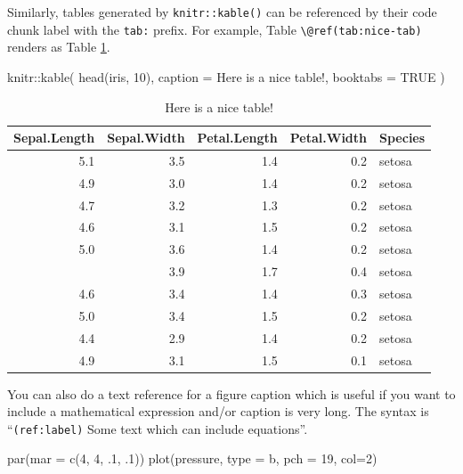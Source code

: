 \documentclass[
  british,
  oneside]{krantz}
\newenvironment{Shaded}{\begin{snugshade}}{\end{snugshade}}
\newcommand{\AttributeTok}[1]{\textcolor[rgb]{0.77,0.63,0.00}{#1}}
\newcommand{\ConstantTok}[1]{\textcolor[rgb]{0.00,0.00,0.00}{#1}}
\newcommand{\DecValTok}[1]{\textcolor[rgb]{0.00,0.00,0.81}{#1}}
\newcommand{\FunctionTok}[1]{\textcolor[rgb]{0.00,0.00,0.00}{#1}}
\newcommand{\NormalTok}[1]{#1}
\newcommand{\SpecialCharTok}[1]{\textcolor[rgb]{0.00,0.00,0.00}{#1}}
\newcommand{\StringTok}[1]{\textcolor[rgb]{0.31,0.60,0.02}{#1}}
\theoremstyle{definition}
\theoremstyle{definition}
\theoremstyle{definition}
\theoremstyle{definition}
\theoremstyle{remark}
\begin{document}
Similarly, tables generated by \texttt{knitr::kable()} can be referenced by their code chunk label with the \texttt{tab:} prefix. For example, Table \texttt{\textbackslash{}@ref(tab:nice-tab)} renders as Table \ref{tab:nice-tab}.

\begin{Shaded}
\begin{Highlighting}[]
\NormalTok{knitr}\SpecialCharTok{::}\FunctionTok{kable}\NormalTok{(}
  \FunctionTok{head}\NormalTok{(iris, }\DecValTok{10}\NormalTok{), }\AttributeTok{caption =} \StringTok{\textquotesingle{}Here is a nice table!\textquotesingle{}}\NormalTok{,}
  \AttributeTok{booktabs =} \ConstantTok{TRUE}
\NormalTok{)}
\end{Highlighting}
\end{Shaded}

\begin{table}

\caption{\label{tab:nice-tab}Here is a nice table!}
\centering
\begin{tabular}[t]{rrrrl}
\toprule
Sepal.Length & Sepal.Width & Petal.Length & Petal.Width & Species\\
\midrule
5.1 & 3.5 & 1.4 & 0.2 & setosa\\
4.9 & 3.0 & 1.4 & 0.2 & setosa\\
4.7 & 3.2 & 1.3 & 0.2 & setosa\\
4.6 & 3.1 & 1.5 & 0.2 & setosa\\
5.0 & 3.6 & 1.4 & 0.2 & setosa\\
\addlinespace
5.4 & 3.9 & 1.7 & 0.4 & setosa\\
4.6 & 3.4 & 1.4 & 0.3 & setosa\\
5.0 & 3.4 & 1.5 & 0.2 & setosa\\
4.4 & 2.9 & 1.4 & 0.2 & setosa\\
4.9 & 3.1 & 1.5 & 0.1 & setosa\\
\bottomrule
\end{tabular}
\end{table}

You can also do a text reference for a figure caption which is useful if you want to include a mathematical expression and/or caption is very long. The syntax is ``\texttt{(ref:label)} Some text which can include equations''.



\begin{Shaded}
\begin{Highlighting}[]
\FunctionTok{par}\NormalTok{(}\AttributeTok{mar =} \FunctionTok{c}\NormalTok{(}\DecValTok{4}\NormalTok{, }\DecValTok{4}\NormalTok{, .}\DecValTok{1}\NormalTok{, .}\DecValTok{1}\NormalTok{))}
\FunctionTok{plot}\NormalTok{(pressure, }\AttributeTok{type =} \StringTok{\textquotesingle{}b\textquotesingle{}}\NormalTok{, }\AttributeTok{pch =} \DecValTok{19}\NormalTok{, }\AttributeTok{col=}\DecValTok{2}\NormalTok{)}
\end{Highlighting}
\end{Shaded}
\end{document}
